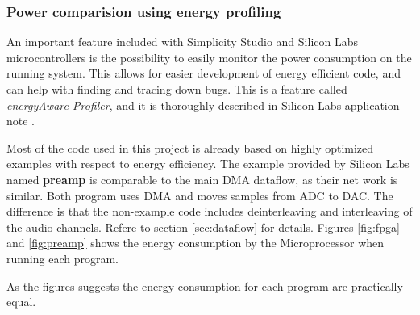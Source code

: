 \subsubsection{Power comparision using energy profiling}

An important feature included with Simplicity Studio and Silicon Labs microcontrollers
is the possibility to easily monitor the power consumption on the running system.
This allows for easier development of energy efficient code, and can help
with finding and tracing down bugs. 
This is a feature called \textit{energyAware Profiler}, and it is thoroughly 
described in Silicon Labs application note \cite{energydbg}.

Most of the code used in this project is already based on highly optimized 
examples with respect to energy efficiency.
The example provided by Silicon Labs named {\bf preamp} is comparable to the main
DMA dataflow, as their net work is similar. Both program uses DMA and moves samples 
from ADC to DAC. The difference is that the non-example code includes deinterleaving
and interleaving of the audio channels. Refere to section \ref{sec:dataflow} 
for details. Figures \ref{fig:fpga} and \ref{fig:preamp}
shows the energy consumption by the Microprocessor when running each program.





As the figures suggests the energy consumption for each program are practically equal.
